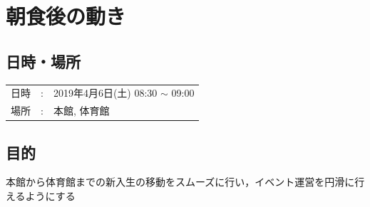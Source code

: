 %

\section{朝食後の動き}


\subsection{日時・場所}
\begin{tabular}{p{}rp{}}
  日時 & : & 2019年4月6日(土) 08:30 $\sim$ 09:00\\
  場所 & : & 本館, 体育館
\end{tabular}

\subsection{目的}
本館から体育館までの新入生の移動をスムーズに行い，イベント運営を円滑に行えるようにする

